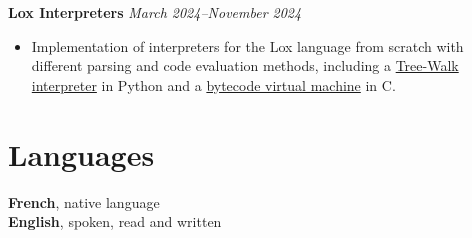 \documentclass[margin,line]{../res}
\begin{document}
\begin{resume}
  {\bf Lox Interpreters}
  \hfill {\it March 2024--November 2024}
  \vspace*{.05in}
  \begin{itemize}
    \item Implementation of interpreters for the Lox language from
      scratch with different parsing and code evaluation methods,
      including a
      \href{https://github.com/theobori/tinylox}{Tree-Walk interpreter}
      in Python and a
      \href{https://github.com/theobori/lox-virtual-machine}{bytecode
      virtual machine} in C.
  \end{itemize}

  \section{\sc Languages}
  \begingroup
  \raggedright
  {\bf French}, native language\\
  \vspace*{.15in}
  {\bf English}, spoken, read and written
  \endgroup

\end{resume}
\end{document}
